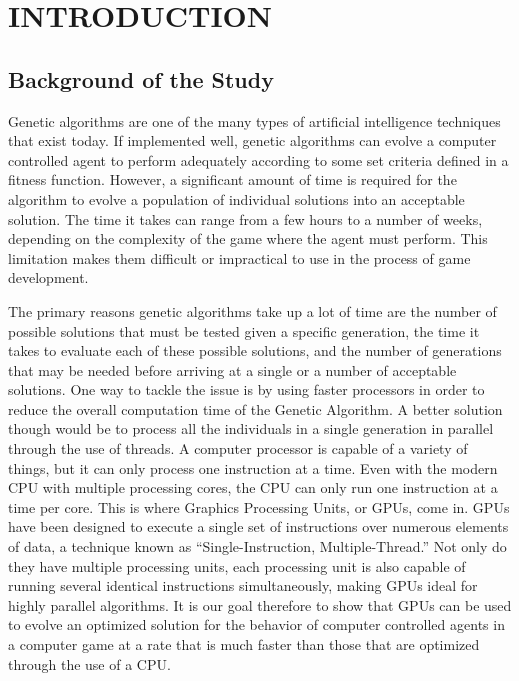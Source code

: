 \chapter{INTRODUCTION}

\section{Background of the Study}

Genetic algorithms are one of the many types of artificial intelligence
techniques that exist today. If implemented well, genetic algorithms can
evolve a computer controlled agent to perform adequately according to some
set criteria defined in a fitness function. However, a significant amount of 
time is required for the algorithm to evolve a population of individual solutions 
into an acceptable solution\cite{Schwab04}. The time it takes can range from
a few hours to a number of weeks, depending on the complexity of the game where
the agent must perform. This limitation makes them difficult or impractical to
use in the process of game development\cite{Schwab04}.

The primary reasons genetic algorithms take up a lot of time are the number of 
possible solutions that must be tested given a specific generation, the time it 
takes to evaluate each of these possible solutions, and the number of generations 
that may be needed before arriving at a single or a number of acceptable solutions\cite{Schwab04}. 
One way to tackle the issue is by using faster processors in order to reduce the
overall computation time of the Genetic Algorithm. A better solution though would
be to process all the individuals in a single generation in parallel through the
use of threads. A computer processor is capable of a variety of things, but it can only process
one instruction at a time. Even with the modern CPU with multiple processing cores, the CPU can only
run one instruction at a time per core. This is where Graphics Processing Units, or GPUs, come in.
GPUs have been designed to execute a single set of instructions over numerous elements
of data, a technique known as ``Single-Instruction, Multiple-Thread\cite{pdf:NVCudaPrgGuide}.''
Not only do they have multiple processing units, each processing unit is also
capable of running several identical instructions simultaneously, making GPUs ideal
for highly parallel algorithms\cite{pdf:NVCudaPrgGuide}. It is our goal therefore to
show that GPUs can be used to evolve an optimized solution for the behavior of computer
controlled agents in a computer game at a rate that is much faster than those that are optimized
through the use of a CPU.

